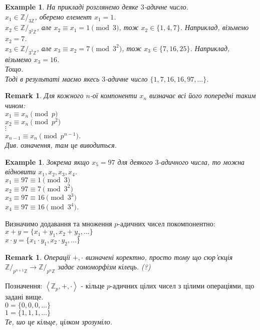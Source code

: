 \documentclass[a4paper, 14pt]{extarticle}
\theoremstyle{theoremdd}
\theoremstyle{theoremdd}
\theoremstyle{theoremdd}
\theoremstyle{theoremdd}
\newtheorem{example}[theorem]{Example}
\theoremstyle{theoremdd}
\theoremstyle{theoremdd}
\newtheorem{remark}[theorem]{Remark}
\theoremstyle{theoremdd}
\theoremstyle{theoremdd}
\begin{document}
\begin{example}
На прикладі розглянемо деяке $3$-адичне число.\\
$x_1 \in \mathbb{Z}/_{3 \mathbb{Z}}$, оберемо елемент $x_1 = 1$.\\
$x_2 \in \mathbb{Z}/_{3^2 \mathbb{Z}}$, але $x_2 \equiv x_1 = 1 \pmod 3$, тож $x_2 \in \{1,4,7\}$. Наприклад, візьмемо $x_2 = 7$.\\
$x_3 \in \mathbb{Z}/_{3^3 \mathbb{Z}}$, але $x_3 \equiv x_2 = 7 \pmod {3^2}$, тож $x_3 \in \{7,16,25\}$. Наприклад, візьмемо $x_3 = 16$.\\
Тощо.\\
Тоді в результаті маємо якесь $3$-адичне число $\{1,7,16,16,97,\dots\}$.
\end{example}

\begin{remark}
Для кожного $n$-ої компоненти $x_n$ визначає всі його попередні таким чином:\\
$x_1 \equiv x_n \pmod p$\\
$x_2 \equiv x_n \pmod {p^2}$\\
$\vdots$\\
$x_{n-1} \equiv x_n \pmod {p^{n-1}}$.\\
\textit{Див. означення, там це виводиться.}
\end{remark}

\begin{example}
Зокрема якщо $x_5 = 97$ для деякого $3$-адичного числа, то можна відновити $x_1,x_2,x_3,x_4$.\\
$x_1 \equiv 97 \equiv 1 \pmod 3$\\
$x_2 \equiv 97 \equiv 7 \pmod {3^2}$\\
$x_3 \equiv 97 \equiv 16 \pmod {3^3}$\\
$x_4 \equiv 97 \equiv 16 \pmod {3^4}$.
\end{example}

Визначимо додавання та множення $p$-адичних чисел покомпонентно:\\
$x+y = \{ x_1+y_1, x_2+y_2,\dots \}$\\
$x \cdot y = \{x_1 \cdot y_1, x_2 \cdot y_2, \dots\}$

\begin{remark}
Операції $+, \cdot$ визначені коректно, просто тому що сюр'єкція $\mathbb{Z}/_{p^{n+1} \mathbb{Z}} \to \mathbb{Z}/_{p^n \mathbb{Z}}$ задає гомоморфізм кілець. (?)
\end{remark}

Позначення: $\left<\mathbb{Z}_p,+,\cdot\right>$ - кільце $p$-адичних цілих чисел з цілими операціями, що задані вище.\\
$0 = \{0,0,0,\dots\}$\\
$1 = \{1,1,1,\dots\}$\\
\textit{Те, шо це кільце, цілком зрозуміло.}
\end{document}
